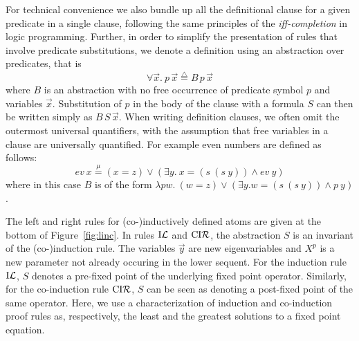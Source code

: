 \documentclass[preprint]{elsarticle}
\newcommand{\defeq}{\stackrel{\scriptscriptstyle\triangle}{=}}
\newcommand{\defmu}{\stackrel{\mu}{=}}
\newcommand{\indL}{{\rm I}{\cal L}}
\newcommand{\coindR}{{\rm CI}{\cal R}}
\begin{document}
For technical convenience we also bundle up all the
definitional clause for a given predicate in a single clause, 
following the same principles of the \emph{iff-completion} in logic
programming. Further, in order to simplify the presentation of rules that involve
predicate substitutions, we denote a definition using an abstraction
over predicates, that is
$$
\forall \vec x.\ p\,\vec x \defeq B\,p\,\vec x
$$
where $B$ is an abstraction with no free occurrence of predicate
symbol $p$ and variables $\vec x$.  Substitution of $p$ in the body of
the clause with a formula $S$ can then be written simply as
$B\,S\,\vec x$.  When writing definition clauses, we often omit the
outermost universal quantifiers, with the assumption that free
variables in a clause are universally quantified. For example even
numbers are defined as follows:
$$ev~x \defmu (x = z) \lor (\exists y.\ x = (s~(s~y)) \land ev~y)
$$
where in this case $B$ is of the form $\lambda p w.\ (w = z) \lor
(\exists y. w = (s~(s~y)) \land p~y)$.




The left and right rules for (co-)inductively defined atoms are given
at the bottom of Figure~\ref{fig:linc}.  In rules $\indL$ and
$\coindR$, the abstraction $S$ is an invariant of the (co-)induction
rule. The variables $\vec{y}$ are
new eigenvariables and $X^p$ is a new parameter not already occuring
in the lower sequent.  For the induction rule $\indL$, $S$ denotes a
pre-fixed point of the underlying fixed point operator. Similarly, for
the co-induction rule $\coindR$, $S$ can be seen as denoting a
{post-fixed point} of the same operator.  Here, we use a
characterization of induction and co-induction proof rules as,
respectively, the least and the greatest solutions to a fixed point
equation.
\end{document}
